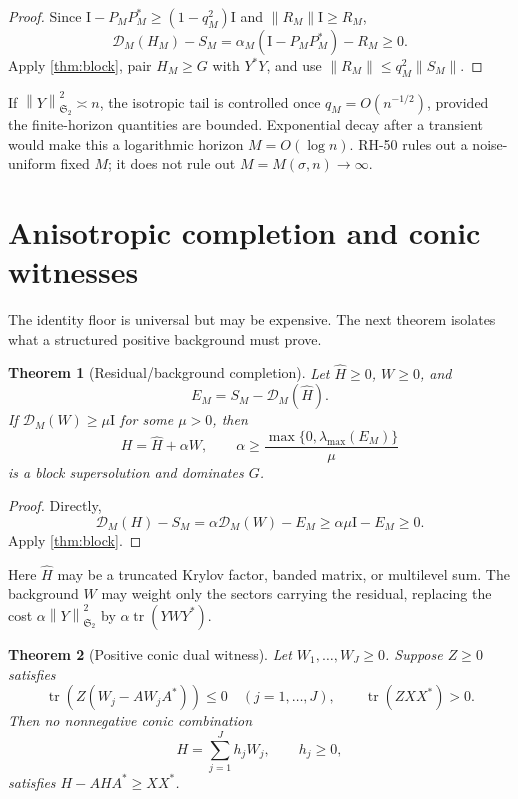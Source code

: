 \documentclass[11pt]{article}
\newtheorem{theorem}{Theorem}[section]
\theoremstyle{definition}
\theoremstyle{remark}
\newcommand{\Id}{\mathrm I}
\newcommand{\cD}{\mathcal D}
\newcommand{\HS}{\mathfrak S_2}
\newcommand{\tr}{\operatorname{tr}}
\newcommand{\norm}[1]{\left\lVert #1\right\rVert}
\begin{document}
\begin{proof}
Since
\(\Id-P_MP_M^*\ge(1-q_M^2)\Id\) and
\(\norm{R_M}\Id\ge R_M\),
\[
 \cD_M(H_M)-S_M
 =
 \alpha_M(\Id-P_MP_M^*)-R_M\ge0.
\]
Apply \cref{thm:block}, pair \(H_M\ge G\) with \(Y^*Y\), and use
\(\norm{R_M}\le q_M^2\norm{S_M}\).
\end{proof}

If \(\norm Y_{\HS}^2\asymp n\), the isotropic tail is controlled once
\(q_M=O(n^{-1/2})\), provided the finite-horizon quantities are bounded.
Exponential decay after a transient would make this a logarithmic horizon
\(M=O(\log n)\).  RH-50 rules out a noise-uniform fixed \(M\); it does not
rule out \(M=M(\sigma,n)\to\infty\).

\section{Anisotropic completion and conic witnesses}

The identity floor is universal but may be expensive.  The next theorem
isolates what a structured positive background must prove.

\begin{theorem}[Residual/background completion]
\label{thm:background}
Let \(\widehat H\ge0\), \(W\ge0\), and
\[
 E_M=S_M-\cD_M(\widehat H).
\]
If \(\cD_M(W)\ge\mu\Id\) for some \(\mu>0\), then
\[
 H=\widehat H+\alpha W,
 \qquad
 \alpha\ge
 \frac{\max\{0,\lambda_{\max}(E_M)\}}{\mu}
\]
is a block supersolution and dominates \(G\).
\end{theorem}

\begin{proof}
Directly,
\[
 \cD_M(H)-S_M
 =\alpha\cD_M(W)-E_M
 \ge\alpha\mu\Id-E_M\ge0.
\]
Apply \cref{thm:block}.
\end{proof}

Here \(\widehat H\) may be a truncated Krylov factor, banded matrix, or
multilevel sum.  The background \(W\) may weight only the sectors carrying
the residual, replacing the cost \(\alpha\norm Y_{\HS}^2\) by
\(\alpha\tr(YWY^*)\).

\begin{theorem}[Positive conic dual witness]
\label{thm:conic}
Let \(W_1,\ldots,W_J\ge0\).  Suppose \(Z\ge0\) satisfies
\[
 \tr\!\left(Z(W_j-AW_jA^*)\right)\le0
 \quad(j=1,\ldots,J),
 \qquad
 \tr(ZXX^*)>0.
\]
Then no nonnegative conic combination
\[
 H=\sum_{j=1}^Jh_jW_j,
 \qquad h_j\ge0,
\]
satisfies \(H-AHA^*\ge XX^*\).
\end{theorem}
\end{document}
